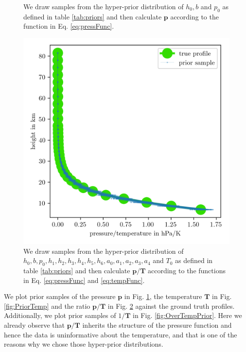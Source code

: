 \begin{figure}[ht!]
	\centering
	
	\caption[Prior Samples of $\bm{p}$ according to the respective hyper-prior distribution.]{We draw samples from the hyper-prior distribution of $h_0, b$ and $p_0$ as defined in table \ref{tab:priors} and then calculate $\bm{p}$ according to the function in Eq. \ref{eq:pressFunc}.}
	\label{fig:PriorPress}
\end{figure}
\begin{figure}[ht!]
	\centering
	\includegraphics{PriorTempOverPostMeanSigm.png}
	\caption[Prior Samples of $\bm{p}/\bm{T}$ according to the respective hyper-prior distribution.]{We draw samples from the hyper-prior distribution of $h_0, b, p_0, h_1, h_2,h_3,h_4,h_5,h_6, a_0, a_1, a_2,a_3,a_4$ and $T_0$ as defined in table \ref{tab:priors} and then calculate $\bm{p}/\bm{T}$ according to the functions in Eq. \ref{eq:pressFunc} and \ref{eq:tempFunc}.}
	\label{fig:PriorPressOverTemp}
\end{figure}


We plot prior samples of the pressure $\bm{p}$ in Fig. \ref{fig:PriorPress}, the temperature $\bm{T}$ in Fig. \ref{fig:PriorTemp} and the ratio $\bm{p}/\bm{T}$ in Fig. \ref{fig:PriorPressOverTemp} against the ground truth profiles.
Additionally, we plot prior samples of $1/\bm{T}$ in Fig. \ref{fig:OverTempPrior}.
Here we already observe that $\bm{p}/\bm{T}$ inherits the structure of the pressure function and hence the data is uninformative about the temperature, and that is one of the reasons why we chose those hyper-prior distributions.

